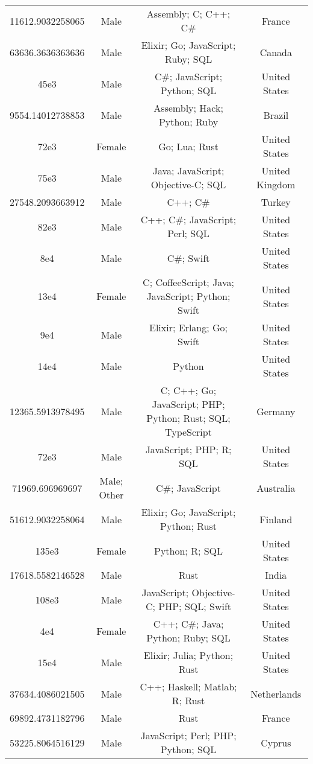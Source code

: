 \begin{center}
\begin{tabular}{ |c|c|c|c| }
11612.9032258065  &  Male  &  Assembly; C; C++; C\#  &  France  \\ 
63636.3636363636  &  Male  &  Elixir; Go; JavaScript; Ruby; SQL  &  Canada  \\ 
45e3  &  Male  &  C\#; JavaScript; Python; SQL  &  United States  \\ 
9554.14012738853  &  Male  &  Assembly; Hack; Python; Ruby  &  Brazil  \\ 
72e3  &  Female  &  Go; Lua; Rust  &  United States  \\ 
75e3  &  Male  &  Java; JavaScript; Objective-C; SQL  &  United Kingdom  \\ 
27548.2093663912  &  Male  &  C++; C\#  &  Turkey  \\ 
82e3  &  Male  &  C++; C\#; JavaScript; Perl; SQL  &  United States  \\ 
8e4  &  Male  &  C\#; Swift  &  United States  \\ 
13e4  &  Female  &  C; CoffeeScript; Java; JavaScript; Python; Swift  &  United States  \\ 
9e4  &  Male  &  Elixir; Erlang; Go; Swift  &  United States  \\ 
14e4  &  Male  &  Python  &  United States  \\ 
12365.5913978495  &  Male  &  C; C++; Go; JavaScript; PHP; Python; Rust; SQL; TypeScript  &  Germany  \\ 
72e3  &  Male  &  JavaScript; PHP; R; SQL  &  United States  \\ 
71969.696969697  &  Male; Other  &  C\#; JavaScript  &  Australia  \\ 
51612.9032258064  &  Male  &  Elixir; Go; JavaScript; Python; Rust  &  Finland  \\ 
135e3  &  Female  &  Python; R; SQL  &  United States  \\ 
17618.5582146528  &  Male  &  Rust  &  India  \\ 
108e3  &  Male  &  JavaScript; Objective-C; PHP; SQL; Swift  &  United States  \\ 
4e4  &  Female  &  C++; C\#; Java; Python; Ruby; SQL  &  United States  \\ 
15e4  &  Male  &  Elixir; Julia; Python; Rust  &  United States  \\ 
37634.4086021505  &  Male  &  C++; Haskell; Matlab; R; Rust  &  Netherlands  \\ 
69892.4731182796  &  Male  &  Rust  &  France  \\ 
53225.8064516129  &  Male  &  JavaScript; Perl; PHP; Python; SQL  &  Cyprus  \\ 

\end{tabular}
\end{center}
